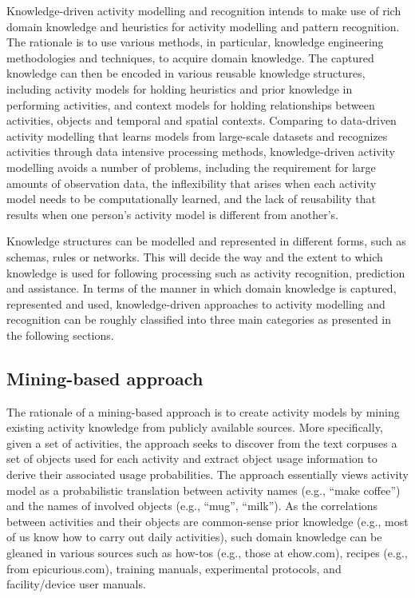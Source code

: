 Knowledge-driven activity modelling and recognition intends to make use of rich domain knowledge and heuristics for activity modelling and pattern recognition. The rationale is to use various methods, in particular, knowledge engineering methodologies and techniques, to acquire domain knowledge. The captured knowledge can then be encoded in various reusable knowledge structures, including activity models for holding heuristics and prior knowledge in performing activities, and context models for holding relationships between activities, objects and temporal and spatial contexts. Comparing to data-driven activity modelling that learns models from large-scale datasets and recognizes activities through data intensive processing methods, knowledge-driven activity modelling avoids a number of problems, including the requirement for large amounts of observation data, the inflexibility that arises when each activity model needs to be computationally learned, and the lack of reusability that results when one person’s activity model is different from another’s. 

Knowledge structures can be modelled and represented in different forms, such as schemas, rules or networks. This will decide the way and the extent to which knowledge is used for following processing such as activity recognition, prediction and assistance. In terms of the manner in which domain knowledge is captured, represented and used, knowledge-driven approaches to activity modelling and recognition can be roughly classified into three main categories as presented in the following sections.

\subsection{Mining-based approach}

The rationale of a mining-based approach is to create activity models by mining existing activity knowledge from publicly available sources. More specifically, given a set of activities, the approach seeks to discover from the text corpuses a set of objects used for each activity and extract object usage information to derive their associated usage probabilities. The approach essentially views activity model as a probabilistic translation between activity names (e.g., “make coffee”) and the names of involved objects (e.g., “mug”, “milk”). As the correlations between activities and their objects are common-sense prior knowledge (e.g., most of us know how to carry out daily activities), such domain knowledge can be gleaned in various sources such as how-tos (e.g., those at ehow.com), recipes (e.g., from epicurious.com), training manuals, experimental protocols, and facility/device user manuals.

